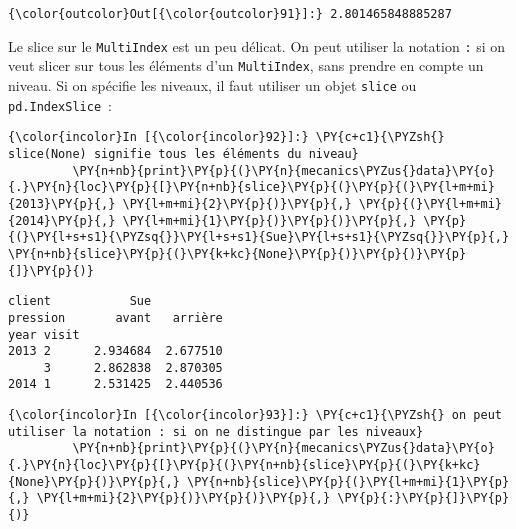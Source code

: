 \begin{Verbatim}[commandchars=\\\{\},frame=single,framerule=0.3mm,rulecolor=\color{cellframecolor}]
{\color{outcolor}Out[{\color{outcolor}91}]:} 2.801465848885287
\end{Verbatim}
            
    Le slice sur le \texttt{MultiIndex} est un peu délicat. On peut utiliser
la notation \texttt{:} si on veut slicer sur tous les éléments d'un
\texttt{MultiIndex}, sans prendre en compte un niveau. Si on spécifie
les niveaux, il faut utiliser un objet \texttt{slice} ou
\texttt{pd.IndexSlice}~:

    \begin{Verbatim}[commandchars=\\\{\},frame=single,framerule=0.3mm,rulecolor=\color{cellframecolor}]
{\color{incolor}In [{\color{incolor}92}]:} \PY{c+c1}{\PYZsh{} slice(None) signifie tous les éléments du niveau}
         \PY{n+nb}{print}\PY{p}{(}\PY{n}{mecanics\PYZus{}data}\PY{o}{.}\PY{n}{loc}\PY{p}{[}\PY{n+nb}{slice}\PY{p}{(}\PY{p}{(}\PY{l+m+mi}{2013}\PY{p}{,} \PY{l+m+mi}{2}\PY{p}{)}\PY{p}{,} \PY{p}{(}\PY{l+m+mi}{2014}\PY{p}{,} \PY{l+m+mi}{1}\PY{p}{)}\PY{p}{)}\PY{p}{,} \PY{p}{(}\PY{l+s+s1}{\PYZsq{}}\PY{l+s+s1}{Sue}\PY{l+s+s1}{\PYZsq{}}\PY{p}{,} \PY{n+nb}{slice}\PY{p}{(}\PY{k+kc}{None}\PY{p}{)}\PY{p}{)}\PY{p}{]}\PY{p}{)}
\end{Verbatim}


    \begin{Verbatim}[commandchars=\\\{\},frame=single,framerule=0.3mm,rulecolor=\color{cellframecolor}]
client           Sue          
pression       avant   arrière
year visit                    
2013 2      2.934684  2.677510
     3      2.862838  2.870305
2014 1      2.531425  2.440536
\end{Verbatim}

    \begin{Verbatim}[commandchars=\\\{\},frame=single,framerule=0.3mm,rulecolor=\color{cellframecolor}]
{\color{incolor}In [{\color{incolor}93}]:} \PY{c+c1}{\PYZsh{} on peut utiliser la notation : si on ne distingue par les niveaux}
         \PY{n+nb}{print}\PY{p}{(}\PY{n}{mecanics\PYZus{}data}\PY{o}{.}\PY{n}{loc}\PY{p}{[}\PY{p}{(}\PY{n+nb}{slice}\PY{p}{(}\PY{k+kc}{None}\PY{p}{)}\PY{p}{,} \PY{n+nb}{slice}\PY{p}{(}\PY{l+m+mi}{1}\PY{p}{,} \PY{l+m+mi}{2}\PY{p}{)}\PY{p}{)}\PY{p}{,} \PY{p}{:}\PY{p}{]}\PY{p}{)}
\end{Verbatim}


